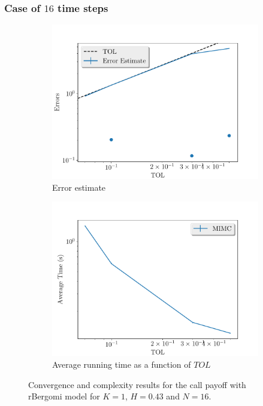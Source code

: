 \documentclass[11pt]{article}
\begin{document}
\newpage
\subsubsection*{Case of $16$ time steps}
\begin{figure}[!h]
	\centering
	\begin{subfigure}{.4\textwidth}
		\centering
		\includegraphics[width=1\linewidth]{./figures/bergomi_misc/non_hierarchical/H_043/N_16/error_estimate.pdf}
		\caption{Error estimate}
		\label{fig:misc_rbergomi_8_steps_sub1}
	\end{subfigure}%
	\begin{subfigure}{.4\textwidth}
		\centering
		\includegraphics[width=1\linewidth]{./figures/bergomi_misc/non_hierarchical/H_043/N_16/average_running_time.pdf}
		\caption{Average running time as a function of $TOL$}
		\label{fig:misc_rbergomi_8_steps_sub2}
	\end{subfigure}%
	\caption{Convergence and complexity results for the call payoff with rBergomi model for $K=1$, $H=0.43$ and $N=16$.}
	\label{fig:misc_rbergomi_8_steps_1}
\end{figure}
\end{document}
